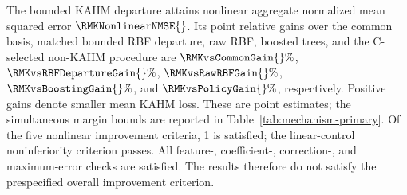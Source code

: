 The bounded KAHM departure attains nonlinear aggregate normalized mean squared error $\RMKNonlinearNMSE{}$.
Its point relative gains over the common basis, matched bounded RBF departure, raw RBF, boosted trees, and the C-selected non-KAHM procedure are
$\RMKvsCommonGain{}\%$, $\RMKvsRBFDepartureGain{}\%$, $\RMKvsRawRBFGain{}\%$, $\RMKvsBoostingGain{}\%$, and $\RMKvsPolicyGain{}\%$, respectively.
Positive gains denote smaller mean KAHM loss. These are point estimates; the simultaneous margin bounds are reported in Table~\ref{tab:mechanism-primary}.
Of the five nonlinear improvement criteria, 1 is satisfied; the linear-control noninferiority criterion passes.
All feature-, coefficient-, correction-, and maximum-error checks are satisfied.
The results therefore do not satisfy the prespecified overall improvement criterion.
